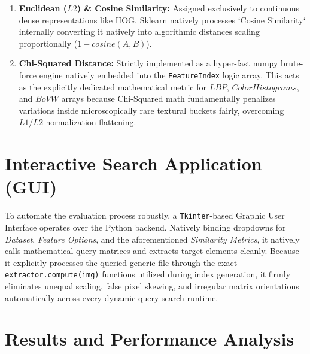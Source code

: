 \documentclass[11pt, a4paper]{article}
\begin{document}
\begin{enumerate}
    \item \textbf{Euclidean ($L2$) \& Cosine Similarity:} Assigned exclusively to continuous dense representations like HOG. Sklearn natively processes `Cosine Similarity` internally converting it natively into algorithmic distances scaling proportionally ($1 - cosine(A,B)$).
    \item \textbf{Chi-Squared Distance:} Strictly implemented as a hyper-fast numpy brute-force engine natively embedded into the \texttt{FeatureIndex} logic array. This acts as the explicitly dedicated mathematical metric for $LBP$, $Color Histograms$, and $BoVW$ arrays because Chi-Squared math fundamentally penalizes variations inside microscopically rare textural buckets fairly, overcoming $L1/L2$ normalization flattening.
\end{enumerate}

\section{Interactive Search Application (GUI)}
To automate the evaluation process robustly, a \texttt{Tkinter}-based Graphic User Interface operates over the Python backend. Natively binding dropdowns for \textit{Dataset}, \textit{Feature Options}, and the aforementioned \textit{Similarity Metrics}, it natively calls mathematical query matrices and extracts target elements cleanly. Because it explicitly processes the queried generic file through the exact \texttt{extractor.compute(img)} functions utilized during index generation, it firmly eliminates unequal scaling, false pixel skewing, and irregular matrix orientations automatically across every dynamic query search runtime.

\section{Results and Performance Analysis}
\end{document}
